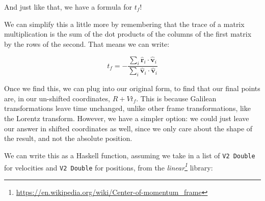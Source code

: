 \documentclass[]{article}
\renewcommand{\href}[2]{#2\footnote{\url{#1}}}
\begin{document}
And just like that, we have a formula for \(t_f\)!

We can simplify this a little more by remembering that the trace of a matrix
multiplication is the sum of the dot products of the columns of the first matrix
by the rows of the second. That means we can write:

\[
t_f = - \frac{\sum_i \hat{\mathbf{r}}_i \cdot \hat{\mathbf{v}}_i}{\sum_i \hat{\mathbf{v}}_i \cdot \hat{\mathbf{v}}_i}
\]

Once we find this, we can plug into our original form, to find that our final
points are, in our un-shifted coordinates, \(R + V t_f\). This is because
Galilean transformations leave time unchanged, unlike other frame
transformations, like the Lorentz transform. However, we have a simpler option:
we could just leave our answer in shifted coordinates as well, since we only
care about the shape of the result, and not the absolute position.

We can write this as a Haskell function, assuming we take in a list of
\texttt{V2\ Double} for velocities and \texttt{V2\ Double} for positions, from
the \emph{\href{https://en.wikipedia.org/wiki/Center-of-momentum_frame}{linear}}
library:
\end{document}
